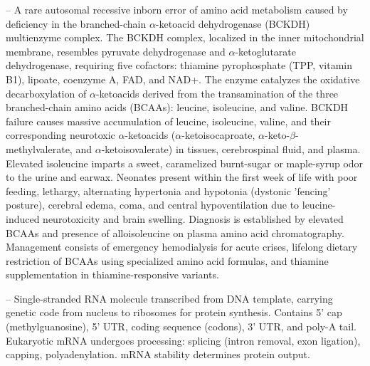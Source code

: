 -- A rare autosomal recessive inborn error of amino acid metabolism caused by deficiency in the branched-chain $\alpha$-ketoacid dehydrogenase (BCKDH) multienzyme complex. The BCKDH complex, localized in the inner mitochondrial membrane, resembles pyruvate dehydrogenase and $\alpha$-ketoglutarate dehydrogenase, requiring five cofactors: thiamine pyrophosphate (TPP, vitamin B1), lipoate, coenzyme A, FAD, and NAD+. The enzyme catalyzes the oxidative decarboxylation of $\alpha$-ketoacids derived from the transamination of the three branched-chain amino acids (BCAAs): leucine, isoleucine, and valine. BCKDH failure causes massive accumulation of leucine, isoleucine, valine, and their corresponding neurotoxic $\alpha$-ketoacids ($\alpha$-ketoisocaproate, $\alpha$-keto-$\beta$-methylvalerate, and $\alpha$-ketoisovalerate) in tissues, cerebrospinal fluid, and plasma. Elevated isoleucine imparts a sweet, caramelized burnt-sugar or maple-syrup odor to the urine and earwax. Neonates present within the first week of life with poor feeding, lethargy, alternating hypertonia and hypotonia (dystonic 'fencing' posture), cerebral edema, coma, and central hypoventilation due to leucine-induced neurotoxicity and brain swelling. Diagnosis is established by elevated BCAAs and presence of alloisoleucine on plasma amino acid chromatography. Management consists of emergency hemodialysis for acute crises, lifelong dietary restriction of BCAAs using specialized amino acid formulas, and thiamine supplementation in thiamine-responsive variants.

-- Single-stranded RNA molecule transcribed from DNA template, carrying genetic code from nucleus to ribosomes for protein synthesis. Contains 5' cap (methylguanosine), 5' UTR, coding sequence (codons), 3' UTR, and poly-A tail. Eukaryotic mRNA undergoes processing: splicing (intron removal, exon ligation), capping, polyadenylation. mRNA stability determines protein output.

